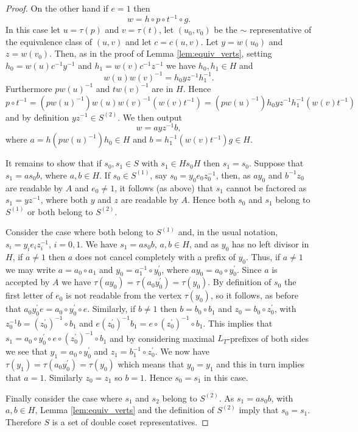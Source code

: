 \documentclass[a4paper,12pt]{article}
\renewcommand{\t}{\tau }
\numberwithin{equation}{section}
\numberwithin{figure}{section}
\begin{document}
\begin{proof}
On the other hand if $e=1$ then
\[w=h\circ p\circ t^{-1}\circ g.\]
In this case let $u=\t(p)$ and $v=\t(t)$,
let $(u_0,v_0)$ be the $\sim$ representative
of the equivalence class of $(u,v)$ and let $c=c(u,v)$.
Let $y=w(u_0)$ and $z=w(v_0)$. Then,  as in the proof of Lemma
\ref{lem:equiv_verts}, setting $h_0=w(u)c^{-1}y^{-1}$ and
$h_1=w(v)c^{-1}z^{-1}$ we have
 $h_0,h_1\in H$ and
\[w(u)w(v)^{-1}=h_0yz^{-1}h_1^{-1}.\] Furthermore
 $p w(u)^{-1}$ and  $t w(v)^{-1}$ are in $H$. Hence
\[
p\circ t^{-1}=( p w(u)^{-1})w(u)w(v)^{-1}( w(v)t^{-1})=( p w(u)^{-1}) h_0 yz^{-1}
h_1^{-1}( w(v)t^{-1})
\]
and by definition $yz^{-1}\in S^{(2)}$. We then output
\[w=a yz^{-1} b,\]
where $a=h ( p w(u)^{-1}) h_0\in H$ and $b=h_1^{-1}( w(v)t^{-1})g \in H$.

It remains to show that if $s_0,s_1\in S$ with $s_1\in Hs_0H$
then $s_1=s_0$. Suppose that $s_1=as_0b$, where $a, b\in H$. If
$s_0\in S^{(1)}$, say $s_0=y_0e_0z_0^{-1}$, then, as $ay_0$ and
$b^{-1}z_0$ are readable by $A$ and $e_0\neq 1$, it follows (as
above) that $s_1$ cannot be factored as $s_1=yz^{-1}$, where both
$y$ and $z$ are readable by $A$. Hence both $s_0$ and $s_1$ belong
to $S^{(1)}$ or both belong to $S^{(2)}$.

Consider the case where both belong to $S^{(1)}$ and, in the usual notation,
$s_i=y_i e_i z_i^{-1}$, $i=0,1$. We have $s_1=as_0b$, $a,b\in H$, and as $y_0$ has
no left divisor in $H$, if $a\neq 1$ then $a$ does not cancel completely with
 a prefix of $y_0$. Thus, if $a\neq 1$ we may write $a=a_0\circ a_1$ and
$y_0=a_1^{-1}\circ y_0^\prime$, where $ay_0=a_0\circ y_0^\prime$. Since
$a$ is accepted by $A$ we have $\t(ay_0)=\t(a_0y_0^\prime)=\t(y_0)$. By definition
of $s_0$ the first letter of $e_0$ is not readable from the vertex $\t(y_0)$, so
it follows, as before that $a_0y_0^\prime e=a_0\circ y_0^\prime \circ e$. Similarly,
if $b\neq 1$ then $b=b_0\circ b_1$ and $z_0=b_0\circ z_0^\prime$, with
$z_0^{-1}b= (z_0^\prime)^{-1}\circ b_1$ and $e (z_0^\prime)^{-1}b_1=
e\circ  (z_0^\prime)^{-1}\circ b_1$. This implies that
$s_1=a_0\circ y_0^\prime \circ  e\circ  (z_0^\prime)^{-1}\circ b_1$ and by considering
maximal $L_T$-prefixes of both sides we see that $y_1=a_0\circ y_0^\prime$ and
$z_1=b_1^{-1}\circ z_0^\prime$. We now have  $\t(y_1)=\t(a_0y_0^\prime)=\t(y_0)$ which
 means that
$y_0=y_1$ and this in turn implies that $a=1$. Similarly $z_0=z_1$ so $b=1$.
Hence $s_0=s_1$ in this case.

Finally consider the case where $s_1$ and $s_2$ belong to
$S^{(2)}$. As $s_1=as_0b$, with $a,b\in H$, Lemma
\ref{lem:equiv_verts} and the definition of $S^{(2)}$ imply  that
$s_0= s_1$. Therefore $S$ is a set of double coset
representatives.
\end{proof}
\end{document}
